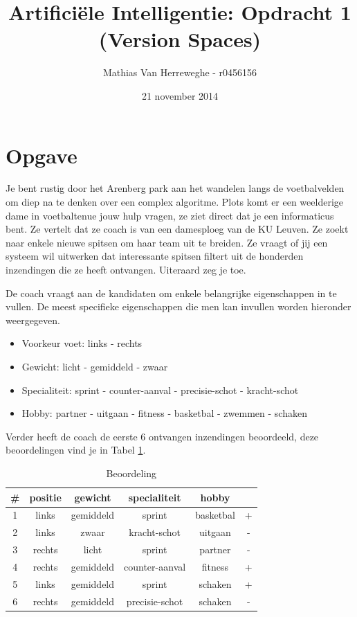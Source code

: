 \documentclass{article}
\title{Artificiële Intelligentie: Opdracht 1 (Version Spaces)}
\author{Mathias Van Herreweghe - r0456156}
\date{21 november 2014}
\begin{document}
\maketitle
\newpage

\section{Opgave}
Je bent rustig door het Arenberg park aan het wandelen langs de voetbalvelden om diep na te denken over een complex algoritme. Plots komt er een weelderige dame in voetbaltenue jouw hulp vragen, ze ziet direct dat je een informaticus bent. Ze vertelt dat ze coach is van een damesploeg van de KU Leuven. Ze zoekt naar enkele nieuwe spitsen om haar team uit te breiden. Ze vraagt of jij een systeem wil uitwerken dat interessante spitsen filtert uit de honderden inzendingen die ze heeft ontvangen. Uiteraard zeg je toe.

De coach vraagt aan de kandidaten om enkele belangrijke eigenschappen in te vullen. De meest specifieke eigenschappen die men kan invullen worden hieronder weergegeven.

\begin{itemize}
\item Voorkeur voet: links - rechts
\item Gewicht: licht - gemiddeld - zwaar
\item Specialiteit: sprint - counter-aanval - precisie-schot - kracht-schot
\item Hobby: partner - uitgaan - fitness - basketbal - zwemmen - schaken
\end{itemize}

Verder heeft de coach de eerste 6 ontvangen inzendingen beoordeeld, deze beoordelingen vind je in Tabel \ref{beoordeling}.

\begin{table}[H]
\centering
\begin{tabular}{ c | c | c | c | c | c}
\hline
 \# & positie & gewicht & specialiteit & hobby \\
  \hline
 1 & links & gemiddeld & sprint & basketbal & + \\
 2 & links & zwaar & kracht-schot & uitgaan & - \\
 3 & rechts & licht & sprint & partner & - \\
 4 & rechts & gemiddeld & counter-aanval  & fitness & + \\
 5 & links & gemiddeld & sprint & schaken & + \\
 6 & rechts & gemiddeld & precisie-schot & schaken & - \\
  \hline
\end{tabular}
\caption{Beoordeling}
\label{beoordeling}
\end{table}
\end{document}
